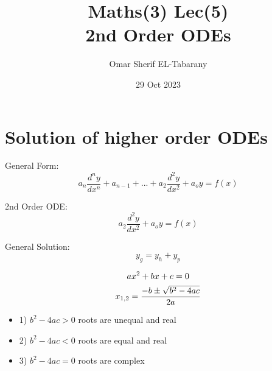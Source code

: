 \documentclass[12pt]{article}
\title{Maths(3) Lec(5) \\ 2nd Order ODEs}
\author{Omar Sherif EL-Tabarany}
\date{29 Oct 2023}
\begin{document}
  \maketitle
  \section{Solution of higher order ODEs}
    General Form: 
      $$ a_n \frac{d^ny}{dx^n} + a_{n-1} + ... + a_2 \frac{d^2y}{dx^2} + a_o y  = f(x)$$

    2nd Order ODE:
    $$ a_2 \frac{d^2y}{dx^2} + a_o y  = f(x) $$

    General Solution:
    $$ y_g = y_h + y_p $$

     $$ ax^2 + bx + c = 0 \\ $$
     $$ x_{1,2} = \frac{-b \pm \sqrt{b^2 - 4ac}}{2a}\\ $$

    \begin{itemize}
      \item 1) $ b^2 - 4ac > 0 $ roots are unequal and real
      \item 2) $ b^2 - 4ac < 0 $ roots are equal and real
      \item 3) $ b^2 - 4ac = 0 $ roots are complex
    \end{itemize}
\end{document}
